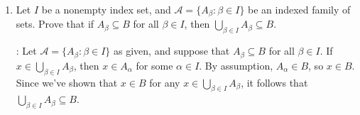 \documentclass[12pt]{article}
\newcommand{\points}[1]{\marginpar{\hspace{24pt}[#1]}}
\newcommand{\di}{\displaystyle}
\begin{document}
\begin{enumerate}
\bigskip



\item Let $I$ be a nonempty index set, and $\mathcal{A} = \{A_\beta : \beta \in I\}$ be an indexed family of sets. Prove that if $A_\beta\subseteq B$ for all $\beta\in I$, then $\di\bigcup_{\beta\in I}A_\beta\subseteq B$.\points{4}

\bigskip

: Let $\mathcal{A}=\{A_\beta:\beta\in I\}$ as given, and suppose that $A_\beta\subseteq B$ for all $\beta\in I$. If $x\in \bigcup_{\beta\in I}A_\beta$, then $x\in A_\alpha$ for some $\alpha\in I$. By assumption, $A_\alpha\in B$, so $x\in B$. Since we've shown that $x\in B$ for any $x\in\bigcup_{\beta\in I}A_\beta$, it follows that $\bigcup_{\beta\in I}A_\beta \subseteq B$.

\bigskip

\end{enumerate}
\end{document}

